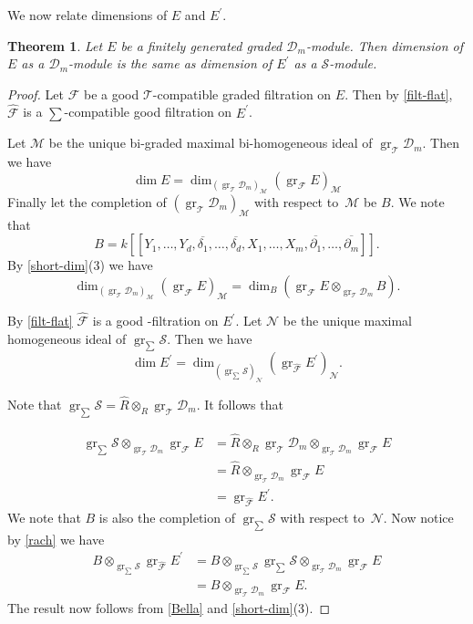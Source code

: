 \documentclass{amsart}
\newcommand{\wrt}{with respect to}
\newcommand{\D}{\mathcal{D} }
\newcommand{\T}{\mathcal{T} }
\newcommand{\F}{\mathcal{F} }
\newcommand{\N}{\mathcal{N} }
\newcommand{\M}{\mathcal{M} }
\newcommand{\Sc}{\mathcal{S} }
\newcommand{\ov}{\overline}
\newcommand{\gr}{\operatorname{gr}}
\theoremstyle{plain}
\newtheorem{theorem}{Theorem}[section]
\theoremstyle{definition}
\theoremstyle{remark}
\begin{document}
We now relate dimensions of $E$ and $E^\prime$.
\begin{theorem}\label{compare-dimension}
Let $E$ be a finitely generated graded $\D_m$-module. Then dimension of $E$ as a $\D_m$-module is the same as dimension of $E^\prime$ as a $\Sc$-module.
\end{theorem}
\begin{proof}
Let $\F$ be a good $\T$-compatible graded filtration on $E$. Then by \ref{filt-flat}, 
$\widehat{\F}$ is a $\sum$-compatible good filtration on $E^\prime$.

Let $\M$ be the unique bi-graded maximal bi-homogeneous ideal of $\gr_\T \D_m$.
Then we have
\[
\dim E = \dim_{(\gr_\T \D_m)_\M} (\gr_\F E)_\M
\]
Finally let the completion of $(\gr_\T \D_m)_\M$ \wrt \  $\M$ be $B$. We note 
that
$$B = k[[Y_1,\ldots, Y_d, \ov{\delta_1}, \ldots, \ov{\delta_d}, X_1,\ldots, X_m, \ov{\partial_1}, \ldots, \ov{\partial_m}]].$$
By \ref{short-dim}(3) we have
\begin{equation}\label{Bella}
\dim_{(\gr_\T \D_m)_\M} (\gr_\F E)_\M = \dim_B  \left( \gr_\F  E \otimes_{\gr_\T \D_m} B \right).
\end{equation}

By \ref{filt-flat} $\widehat{\F}$ is a good -filtration on $E^\prime$.
Let $\N$ be the unique  maximal homogeneous ideal of $\gr_{\sum} \Sc$.
Then we have
\[
\dim E^\prime  = \dim_{(\gr_{\sum} \Sc)_\N} (\gr_{\widehat{\F}} E^\prime )_\N.
\]

Note that $\gr_{\sum} \Sc  = \widehat{R} \otimes_R \gr_\T \D_m$. It follows that

\begin{align}\label{rach}
\gr_{\sum } \Sc \otimes_{\gr_\T \D_m} \gr_\F E &=  \widehat{R}\otimes_R \gr_\T \D_m \otimes_{\gr_\T \D_m} \gr_\F E \\
&= \widehat{R}\otimes_{\gr_\T \D_m} \gr_\F E \\
&= \gr_{\widehat{\F}} E^\prime. 
\end{align}
We note that $B$ is also the completion of $\gr_{\sum} \Sc$ \wrt \ $\N$.
Now notice by \ref{rach} we have
\begin{align*}
B \otimes_{\gr_{\sum} \Sc} \gr_{\widehat{\F}} E^\prime  &= B \otimes_{\gr_{\sum} \Sc} \gr_{\sum } \Sc \otimes_{\gr_\T \D_m} \gr_\F E \\
 &= B \otimes_{\gr_\T \D_m} \gr_\F E.
\end{align*}
The result now follows from \ref{Bella} and \ref{short-dim}(3).
\end{proof}
\end{document}
